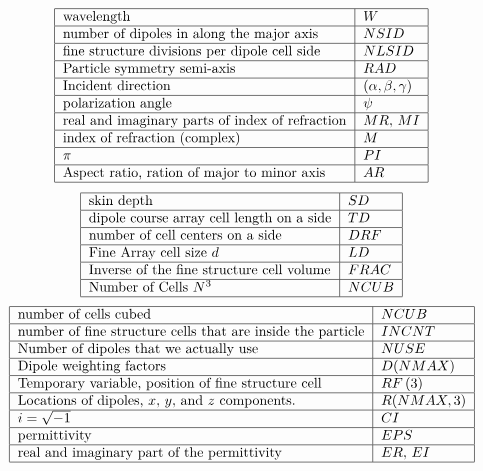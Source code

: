 \documentclass{article}
\begin{document}
\[
\begin{tabular}{|l|l|}
\hline
wavelength & $W$ \\ \hline
number of dipoles in along the major axis & $NSID$ \\ \hline
fine structure divisions per dipole cell side & $NLSID$ \\ \hline
Particle symmetry semi-axis & $RAD$ \\ \hline
Incident direction & $\left( \alpha ,\beta ,\gamma \right) $ \\ \hline
polarization angle & $\psi $ \\ \hline
real and imaginary parts of index of refraction & $MR,$ $MI$ \\ \hline
index of refraction (complex) & $M$ \\ \hline
$\pi $ & $PI$ \\ \hline
Aspect ratio, ration of major to minor axis & $AR$ \\ \hline
\end{tabular}%
\]%
\[
\begin{tabular}{|l|l|}
\hline
skin depth & $SD$ \\ \hline
dipole course array cell length on a side & $TD$ \\ \hline
number of cell centers on a side & $DRF$ \\ \hline
Fine Array cell size $d$ & $LD$ \\ \hline
Inverse of the fine structure cell volume & $FRAC$ \\ \hline
Number of Cells $N^{3}$ & $NCUB$ \\ \hline
\end{tabular}%
\]%
\[
\begin{tabular}{|l|l|}
\hline
number of cells cubed & $NCUB$ \\ \hline
number of fine structure cells that are inside the particle & $INCNT$ \\ 
\hline
Number of dipoles that we actually use & $NUSE$ \\ \hline
Dipole weighting factors & $D(NMAX)$ \\ \hline
Temporary variable, position of fine structure cell & $RF\left( 3\right) $
\\ \hline
Locations of dipoles, $x,$ $y,$ and $z$ components. & $R(NMAX,3)$ \\ \hline
$i=\sqrt{-1}$ & $CI$ \\ \hline
permittivity & $EPS$ \\ \hline
real and imaginary part of the permittivity & $ER,$ $EI$ \\ \hline
\end{tabular}%
\]
\end{document}

